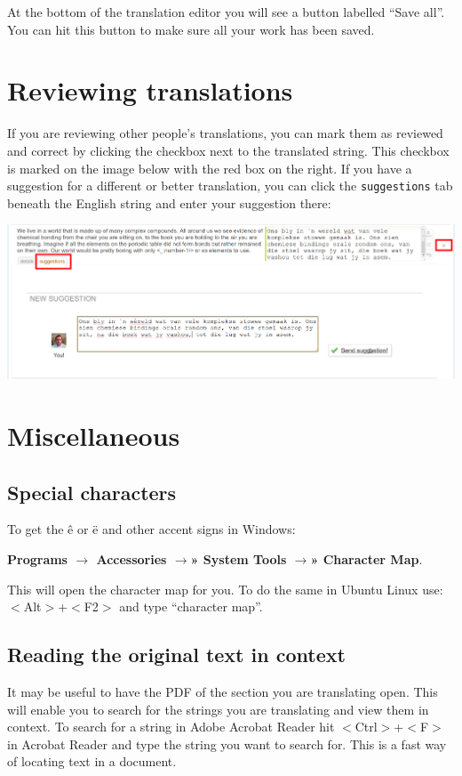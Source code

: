 \documentclass[12pt, a4paper]{article}
\begin{document}
At the bottom of the translation editor you will see a button labelled ``Save all''. You can hit this button to make sure all your work has been saved.

\section{Reviewing translations}

If you are reviewing other people's translations, you can mark them as reviewed and correct by clicking the checkbox next to the translated string. This checkbox is marked on the image below with the red box on the right. If you have a suggestion for a different or better translation, you can click the \texttt{suggestions} tab beneath the English string and enter your suggestion there:
\begin{center}
    \centerline{\includegraphics[width=0.8\paperwidth]{images/suggestion.png}}
\end{center}




\section{Miscellaneous}

\subsection{Special characters}

To get the \^{e} or \"{e} and other accent signs in Windows: 
\begin{center}
\textbf{Programs $\rightarrow$ Accessories $\rightarrow$» System Tools $\rightarrow$» Character Map}. 
\end{center}
This will open the character map for you. To do the same in Ubuntu Linux use: $<$Alt$>$+$<$F2$>$ and type ``character map''.

\subsection{Reading the original text in context}

It may be useful to have the PDF of the section you are translating open. This will enable you to search for the strings you are translating and view them in context. To search for a string in Adobe Acrobat Reader hit $<$Ctrl$>$+$<$F$>$ in Acrobat Reader and type the string you want to search for. This is a fast way of locating text in a document.
\end{document}
